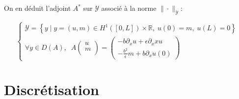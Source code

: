 \documentclass[a4paper]{article}
\newcommand{\dep}{b}
\begin{document}
On en déduit l'adjoint $A^*$ sur $\mathscr{Y}$ associé à la norme $\| \cdot \|_{\mathscr{Y}}$:

\begin{equation}
	\begin{cases}
		\mathscr{Y} = \left\{ y \; | \; y = (u,m) \in H^1([0,L])\times \mathbb{R},
 \; u(0)=m, \; u(L)=0 \right\} \\
        \forall y \in D(A), \; \;
	A \left( \begin{array}{c}
		u\\
		m\\
		\end{array} \right) 
		= \left(\begin{array}{c}
		- \dep \partial_x u + \epsilon \partial_xx u\\
		-\displaystyle \frac{\dep^2}{\epsilon} m + \dep \partial_x u(0)
		\end{array}\right)
	\end{cases}
\end{equation}



\newpage
\section{Discrétisation}





\newpage
\end{document}
